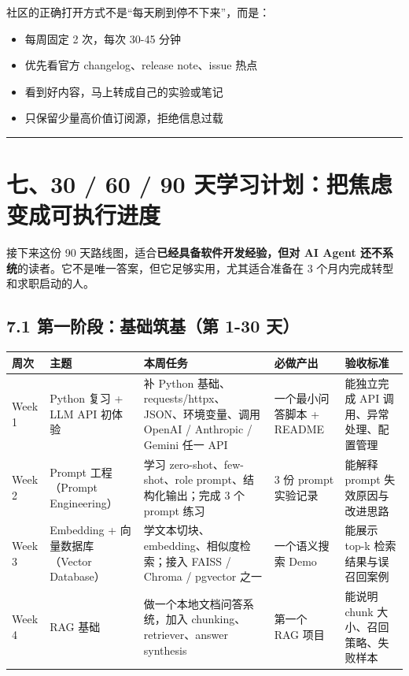 社区的正确打开方式不是``每天刷到停不下来''，而是：


\begin{itemize}[leftmargin=2em]
\item 每周固定 2 次，每次 30-45 分钟
\item 优先看官方 changelog、release note、issue 热点
\item 看到好内容，马上转成自己的实验或笔记
\item 只保留少量高价值订阅源，拒绝信息过载
\end{itemize}

\bigskip\hrule\bigskip

\section{七、30 / 60 / 90 天学习计划：把焦虑变成可执行进度}

接下来这份 90 天路线图，适合\textbf{已经具备软件开发经验，但对 AI Agent 还不系统}的读者。它不是唯一答案，但它足够实用，尤其适合准备在 3 个月内完成转型和求职启动的人。


\subsection{7.1 第一阶段：基础筑基（第 1-30 天）}

\begingroup
\scriptsize
\setlength{\tabcolsep}{3pt}
\begin{longtable}{|p{}|p{}|p{}|p{}|p{}|}
\hline
周次 & 主题 & 本周任务 & 必做产出 & 验收标准 \\ \hline
Week 1 & Python 复习 + LLM API 初体验 & 补 Python 基础、requests/httpx、JSON、环境变量、调用 OpenAI / Anthropic / Gemini 任一 API & 一个最小问答脚本 + README & 能独立完成 API 调用、异常处理、配置管理 \\ \hline
Week 2 & Prompt 工程（Prompt Engineering） & 学习 zero-shot、few-shot、role prompt、结构化输出；完成 3 个 prompt 练习 & 3 份 prompt 实验记录 & 能解释 prompt 失效原因与改进思路 \\ \hline
Week 3 & Embedding + 向量数据库（Vector Database） & 学文本切块、embedding、相似度检索；接入 FAISS / Chroma / pgvector 之一 & 一个语义搜索 Demo & 能展示 top-k 检索结果与误召回案例 \\ \hline
Week 4 & RAG 基础 & 做一个本地文档问答系统，加入 chunking、retriever、answer synthesis & 第一个 RAG 项目 & 能说明 chunk 大小、召回策略、失败样本 \\ \hline
\end{longtable}
\endgroup

